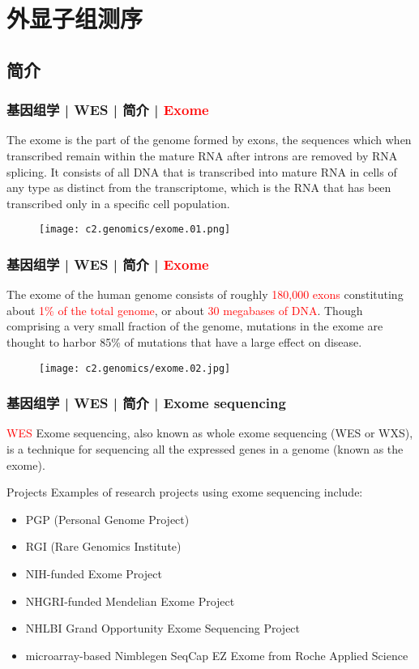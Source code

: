 \section{外显子组测序}
\subsection{简介}
\begin{frame}
  \frametitle{基因组学 | WES | 简介 | \textcolor{red}{Exome}}
  The exome is the part of the genome formed by exons, the sequences which when transcribed remain within the mature RNA after introns are removed by RNA splicing. It consists of all DNA that is transcribed into mature RNA in cells of any type as distinct from the transcriptome, which is the RNA that has been transcribed only in a specific cell population.
  \begin{figure}
    \centering
    \texttt{[image: c2.genomics/exome.01.png]}
  \end{figure}
\end{frame}

\begin{frame}
  \frametitle{基因组学 | WES | 简介 | \textcolor{red}{Exome}}
  The exome of the human genome consists of roughly \textcolor{red}{180,000 exons} constituting about \textcolor{red}{1\% of the total genome}, or about \textcolor{red}{30 megabases of DNA}. Though comprising a very small fraction of the genome, mutations in the exome are thought to harbor 85\% of mutations that have a large effect on disease.
  \begin{figure}
    \centering
    \texttt{[image: c2.genomics/exome.02.jpg]}
  \end{figure}
\end{frame}

\begin{frame}
  \frametitle{基因组学 | WES | 简介 | Exome sequencing}
  \begin{block}{\textcolor{red}{WES}}
  Exome sequencing, also known as whole exome sequencing (WES or WXS), is a technique for sequencing all the expressed genes in a genome (known as the exome).
  \end{block}
  \pause
  \begin{block}{Projects}
    Examples of research projects using exome sequencing include:
    \begin{itemize}
      \item PGP (Personal Genome Project)
      \item RGI (Rare Genomics Institute)
      \item NIH-funded Exome Project
      \item NHGRI-funded Mendelian Exome Project
      \item NHLBI Grand Opportunity Exome Sequencing Project
      \item microarray-based Nimblegen SeqCap EZ Exome from Roche Applied Science
    \end{itemize}
  \end{block}
\end{frame}

